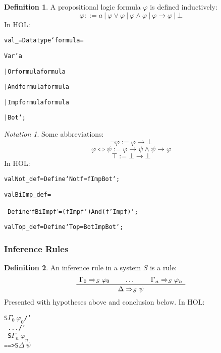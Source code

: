 \documentclass[english,svgnames,hide notes,12pt]{beamer}
\theoremstyle{definition}
\newtheorem{defn}{Definition}
\theoremstyle{remark}
\newtheorem{notn}{Notation}
\begin{document}
\begin{frame}
    \begin{defn}
        A propositional logic formula $\varphi$ is defined inductively:
        \[ \varphi ::= a ~|~ \varphi \lor \varphi ~|~ \varphi \land \varphi ~|~ \varphi \to \varphi ~|~ \bot \]
    In HOL:
    \begin{alltt}
        val _ = Datatype `formula =

        Var 'a
        
        | Or formula formula
        
        | And formula formula
        
        | Imp formula formula
        
        | Bot`;
    \end{alltt}
    \end{defn}
\end{frame}
\begin{frame}
    \begin{notn}
    Some abbreviations: 
        \[ \neg \varphi := \varphi \to \bot \]
        \[ \varphi \Leftrightarrow \psi := \varphi \to \psi \land \psi \to \varphi \]
        \[ \top := \bot \to \bot \]
        In HOL:
        \begin{alltt}
            val Not_def = Define `Not f = f Imp Bot`;

            val BiImp_def = 
            
            ~Define `f BiImp f' = (f Imp f') And (f' Imp f)`;

            val Top_def = Define `Top = Bot Imp Bot`;
        \end{alltt}
    \end{notn}
\end{frame}

\begin{frame}
    \frametitle{Inference Rules}
    \begin{defn}
        An inference rule in a system $S$ is a rule:
        \[
            \AxiomC{$\Gamma_0 \Rightarrow_S \varphi_0$}
            \AxiomC{$\dots$}
            \AxiomC{$\Gamma_n \Rightarrow_S \varphi_n$}  
            \TrinaryInfC{$\Delta \Rightarrow_S \psi$}
            \DisplayProof
        \]
        Presented with hypotheses above and conclusion below.
        In HOL:
        \begin{alltt}
            % !$\Gamma_0$ ... $\Gamma_n$ $\Delta$ $\varphi_0$ ... $\varphi_n$ $\psi$. 
            S $\Gamma_0 ~ \varphi_0$ /\char`\\\ ... /\char`\\\ S $\Gamma_n ~ \varphi_n$ 
            ==> S $\Delta ~ \psi$
        \end{alltt}
    \end{defn}
\end{frame}
\end{document}
